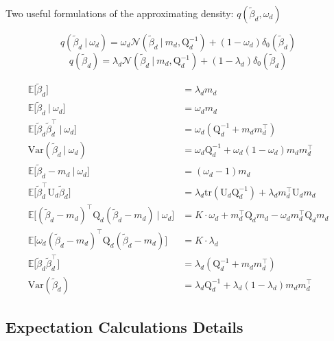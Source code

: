 \documentclass[twoside,11pt]{article}
\newcommand\given[1][]{\:#1\vert\:}
\newcommand{\transpose}[1]{#1^{\intercal}}
\newcommand{\E}{\mathbb{E}}
\newcommand{\betad}{\tilde{\beta}_d}
\newcommand{\umat}{\mathrm{U}}
\newcommand{\qmat}{\mathrm{Q}}
\newcommand{\qbeta}{\mathcal{N} \left( \betad \given m_d, \qmat_d^{-1} \right)}
\newcommand{\trace}[1]{\mathrm{tr} \left( #1 \right)}
\newcommand{\var}[1]{\mathrm{Var}\left(#1\right)}
\begin{document}
Two useful formulations of the approximating density: $q \left( \betad, \omega_d \right)$

\begin{equation} \label{eq:qbeta_omega}
	q(\betad \given \omega_d) = \omega_d \qbeta + (1 - \omega_d) \delta_0(\betad)
\end{equation}
\begin{equation}  \label{eq:qbeta_marginal}
	q(\betad) = \lambda_d \qbeta + (1 - \lambda_d) \delta_0(\betad)
\end{equation}

\begin{align*}
	\E \Big[ \betad \Big] &= \lambda_d m_d \\
	\E \Big[ \betad \given \omega_d \Big] &=  \omega_d m_d \\
	\E \Big[ \betad \transpose{\betad} \given \omega_d \Big] &= \omega_d \left( \qmat_d^{-1} + m_d \transpose{m_d} \right) \\
	\var{\betad \given \omega_d} &= \omega_d \qmat_d^{-1} + \omega_d(1-\omega_d) m_d \transpose{m_d} \\
	\E\Big[ \betad - m_d \given \omega_d \Big] &= (\omega_d - 1) m_d \\
	\E \Big[ \transpose{\betad} \umat_d \betad \Big] &= \lambda_d \trace{\umat_d \qmat_d^{-1}} + \lambda_d \transpose{m_d} \umat_d m_d \\
	\E \Big[ \transpose{(\betad - m_d)} \qmat_{d}(\betad - m_d) \given \omega_d \Big] &= K \cdot \omega_d + \transpose{m_d}\qmat_d m_d - \omega_d \transpose{m_d}\qmat_d m_d\\
	\E \Big[ \omega_d \transpose{(\betad - m_d)} \qmat_{d}(\betad - m_d) \Big] &= K \cdot \lambda_d \\
	\E \Big[ \betad \transpose{\betad} \Big] &=  \lambda_d \left( \qmat_d^{-1} + m_d \transpose{m_d} \right) \\
	\var{\betad} &= \lambda_d \qmat_d^{-1} + \lambda_d(1 - \lambda_d) m_d \transpose{m_d}
\end{align*}


\subsection{Expectation Calculations Details}
\end{document}
